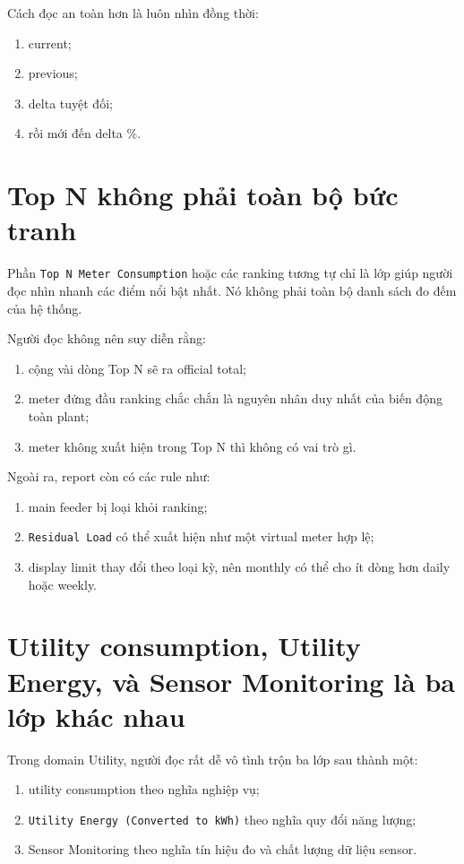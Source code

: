 Cách đọc an toàn hơn là luôn nhìn đồng thời:

\begin{enumerate}[label=-]
\item current;
\item previous;
\item delta tuyệt đối;
\item rồi mới đến delta \%.
\end{enumerate}

\section{Top N không phải toàn bộ bức tranh}

Phần \texttt{Top N Meter Consumption} hoặc các ranking tương tự chỉ là lớp giúp người đọc nhìn nhanh các điểm nổi bật nhất. Nó không phải toàn bộ danh sách đo đếm của hệ thống.

Người đọc không nên suy diễn rằng:

\begin{enumerate}[label=-]
\item cộng vài dòng Top N sẽ ra official total;
\item meter đứng đầu ranking chắc chắn là nguyên nhân duy nhất của biến động toàn plant;
\item meter không xuất hiện trong Top N thì không có vai trò gì.
\end{enumerate}

Ngoài ra, report còn có các rule như:

\begin{enumerate}[label=-]
\item main feeder bị loại khỏi ranking;
\item \texttt{Residual Load} có thể xuất hiện như một virtual meter hợp lệ;
\item display limit thay đổi theo loại kỳ, nên monthly có thể cho ít dòng hơn daily hoặc weekly.
\end{enumerate}

\section{Utility consumption, Utility Energy, và Sensor Monitoring là ba lớp khác nhau}

Trong domain Utility, người đọc rất dễ vô tình trộn ba lớp sau thành một:

\begin{enumerate}[label=-]
\item utility consumption theo nghĩa nghiệp vụ;
\item \texttt{Utility Energy (Converted to kWh)} theo nghĩa quy đổi năng lượng;
\item Sensor Monitoring theo nghĩa tín hiệu đo và chất lượng dữ liệu sensor.
\end{enumerate}

